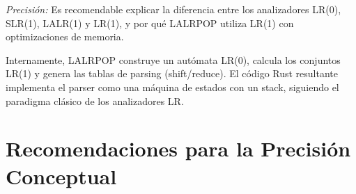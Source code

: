 \documentclass[a4paper,12pt]{article}
\begin{document}
\textit{Precisión:} Es recomendable explicar la diferencia entre los analizadores LR(0), SLR(1), LALR(1) y LR(1), y por qué LALRPOP utiliza LR(1) con optimizaciones de memoria.

Internamente, LALRPOP construye un autómata LR(0), calcula los conjuntos LR(1) y genera las tablas de parsing (shift/reduce). El código Rust resultante implementa el parser como una máquina de estados con un stack, siguiendo el paradigma clásico de los analizadores LR.

\section{Recomendaciones para la Precisión Conceptual}

\end{document}
